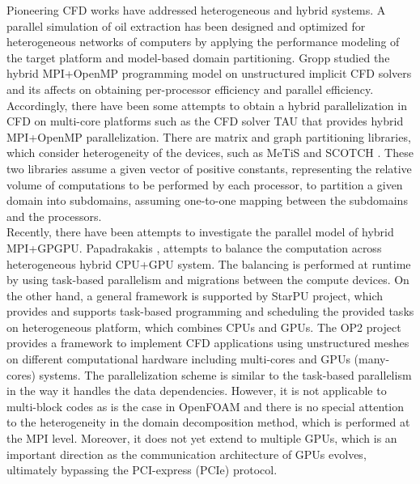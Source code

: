 \documentclass[3p,times]{elsarticle}
\begin{document}
Pioneering CFD works have addressed heterogeneous and hybrid systems. A parallel simulation of oil extraction has been designed and optimized for heterogeneous networks of computers \cite{alexey98} by applying the performance modeling of the target platform and model-based domain partitioning. Gropp \cite{gropp2001high} studied the hybrid MPI+OpenMP programming model on unstructured implicit CFD solvers and its affects on obtaining per-processor efficiency and parallel efficiency. Accordingly, there have been some attempts to obtain a hybrid parallelization in CFD on multi-core platforms \cite{dagnaaevaluation} such as the CFD solver TAU \cite{tauSolver} that provides hybrid MPI+OpenMP parallelization. There are matrix and graph partitioning libraries, which consider heterogeneity of the devices, such as MeTiS \cite{MeTiS} and SCOTCH \cite{scotch}. These two libraries assume a given vector of positive constants, representing the relative volume of computations to be performed by each processor, to partition a given domain into subdomains, assuming one-to-one mapping between the subdomains and the processors. 
~\\

Recently, there have been attempts to investigate the parallel model of hybrid MPI+GPGPU. Papadrakakis \cite{Papadrakakis20111490}, attempts to balance the computation across heterogeneous hybrid CPU+GPU system. The balancing is performed at runtime by using task-based parallelism and migrations between the compute devices. On the other hand, a general framework is supported by StarPU \cite{starpu} project, which provides and supports task-based programming and scheduling the provided tasks on heterogeneous platform, which combines CPUs and GPUs. The OP2 project \cite{OP2} provides a framework to implement CFD applications using unstructured meshes on different computational hardware including multi-cores and GPUs (many-cores) systems. The parallelization scheme is similar to the task-based parallelism in the way it handles the data dependencies. However, it is not applicable to multi-block codes as is the case in OpenFOAM and there is no special attention to the heterogeneity in the domain decomposition method, which is performed at the MPI level. Moreover, it does not yet extend to multiple GPUs, which is an important direction as the communication architecture of GPUs evolves, ultimately bypassing the PCI-express (PCIe) protocol. 
\end{document}

